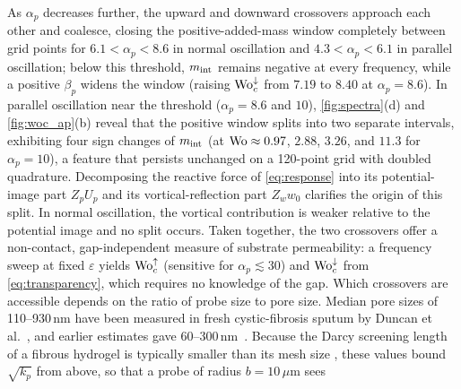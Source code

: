 As $\alpha_p$ decreases further, the upward and downward crossovers approach each other and coalesce, closing the
positive-added-mass window completely between grid points for $6.1<\alpha_p<8.6$ in normal oscillation and
$4.3<\alpha_p<6.1$ in parallel oscillation; below this threshold, $m_{\rm int}$ remains negative at every frequency,
while a positive $\beta_p$ widens the window (raising $\mathrm{Wo}_c^{\downarrow}$ from $7.19$ to $8.40$ at $\alpha_p=8.6$). In
parallel oscillation near the threshold ($\alpha_p=8.6$ and $10$), \cref{fig:spectra}(d) and \cref{fig:woc_ap}(b) reveal
that the positive window splits into two separate intervals, exhibiting four sign changes of $m_{\rm int}$ (at
$\mathrm{Wo}\approx0.97$, $2.88$, $3.26$, and $11.3$ for $\alpha_p=10$), a feature that persists unchanged on a 120-point grid
with doubled quadrature. Decomposing the reactive force of \cref{eq:response} into its potential-image part $Z_pU_p$ and
its vortical-reflection part $Z_ww_0$ clarifies the origin of this split.  In normal oscillation,
the vortical contribution is weaker relative to the potential image and no split occurs. Taken together, the two
crossovers offer a non-contact, gap-independent measure of substrate permeability: a frequency sweep at fixed
$\varepsilon$ yields $\mathrm{Wo}_c^{\uparrow}$ (sensitive for $\alpha_p\lesssim30$) and $\mathrm{Wo}_c^{\downarrow}$ from
\cref{eq:transparency}, which requires no knowledge of the gap. Which crossovers are accessible depends on the ratio of probe size to pore size. Median pore sizes of
110--930\,nm have been measured in fresh cystic-fibrosis sputum by Duncan et al.~\cite{duncan2016microstructural}, and
earlier estimates gave 60--300\,nm~\cite{suk2009penetration}. Because the Darcy screening length of a fibrous hydrogel is typically
smaller than its mesh size , these values bound $\sqrt{k_p}$ from above, so that a probe of radius $b=10\,\mu$m sees
